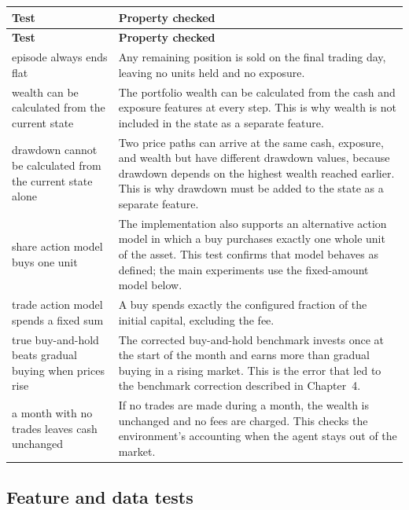 \begin{longtable}{@{}p{}p{}@{}}
\toprule
\textbf{Test} & \textbf{Property checked} \\
\midrule
\endfirsthead
\toprule
\textbf{Test} & \textbf{Property checked} \\
\midrule
\endhead
\bottomrule
\endlastfoot
episode always ends flat & Any remaining position is sold on the final
  trading day, leaving no units held and no exposure. \\
\rowsep
wealth can be calculated from the current state & The portfolio wealth
  can be calculated from the cash and exposure features at every step.
  This is why wealth is not included in the state as a separate
  feature. \\
\rowsep
drawdown cannot be calculated from the current state alone & Two price
  paths can arrive at the same cash, exposure, and wealth but have
  different drawdown values, because drawdown depends on the highest
  wealth reached earlier. This is why drawdown must be added to the
  state as a separate feature. \\
\rowsep
share action model buys one unit & The implementation also supports an
  alternative action model in which a buy purchases exactly one whole
  unit of the asset. This test confirms that model behaves as defined;
  the main experiments use the fixed-amount model below. \\
\rowsep
trade action model spends a fixed sum & A buy spends exactly the
  configured fraction of the initial capital, excluding the fee. \\
\rowsep
true buy-and-hold beats gradual buying when prices rise & The corrected
  buy-and-hold benchmark invests once at the start of the month and earns
  more than gradual buying in a rising market. This is the error that led
  to the benchmark correction described in Chapter~4. \\
\rowsep
a month with no trades leaves cash unchanged & If no trades are made
  during a month, the wealth is unchanged and no fees are charged. This
  checks the environment's accounting when the agent stays out of the
  market. \\
\end{longtable}

\subsection*{Feature and data tests}

